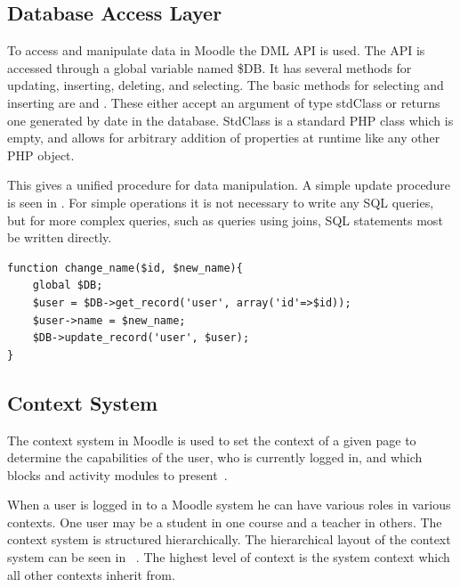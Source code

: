 \subsection{Database Access Layer}
\label{sec:moodleoplatformdbml}
To access and manipulate data in Moodle the DML API is used.  The API is accessed through a global variable named \$DB. 
It has several methods for updating, inserting, deleting, and selecting. 
The basic methods for selecting and inserting are  and .
These either accept an argument of type stdClass or returns one generated by date in the database.
StdClass is a standard PHP class which is empty, and allows for arbitrary addition of properties at runtime like any other PHP object.

This gives a unified procedure for data manipulation. 
A simple update procedure is seen in .
For simple operations it is not necessary to write any SQL queries, but for more complex queries, such as queries using joins, SQL statements most be written directly.
\begin{lstlisting}[style=phpCode, caption=\myCaption{Example of how to change the name of an user}, label=moodlecodeupdate]
function change_name($id, $new_name){
	global $DB;
	$user = $DB->get_record('user', array('id'=>$id));
	$user->name = $new_name;
	$DB->update_record('user', $user);
}
\end{lstlisting}


\subsection{Context System}
\label{sub:contextsystem}
The context system in Moodle is used to set the context of a given page to determine the capabilities of the user, who is currently logged in, and which blocks and activity modules to present~\cite{moodlerolesandmodules}.
 
When a user is logged in to a Moodle system he can have various roles in various contexts. 
One user may be a student in one course and a teacher in others. 
The context system is structured hierarchically.
The hierarchical layout of the context system can be seen in ~\cite{moodlefilemoodlecontext}.
The highest level of context is the system context which all other contexts inherit from.
 
